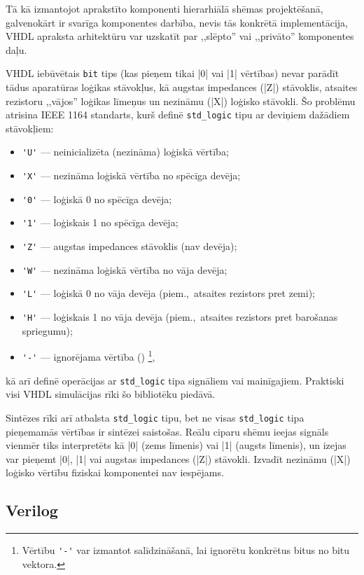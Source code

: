	Tā kā izmantojot aprakstīto komponenti hierarhiālā shēmas projektēšanā, 
	galvenokārt ir svarīga komponentes darbība, nevis tās konkrētā implementācija,
	VHDL apraksta arhitektūru var uzskatīt par ,,slēpto'' vai ,,privāto''
	komponentes daļu.

	VHDL iebūvētais \texttt{bit} tips (kas pieņem tikai |0| vai |1| vērtības)
	nevar parādīt tādus aparatūras loģikas stāvokļus, kā augstas impedances
	(|Z|) stāvoklis, atsaites rezistoru ,,vājos'' loģikas līmeņus un nezināmu
	(|X|) loģisko stāvokli. Šo problēmu atrisina IEEE 1164 standarts, kurš definē
	\texttt{std\_logic} tipu ar deviņiem dažādiem stāvokļiem:
	\begin{itemize}
		\item \verb|'U'| --- neinicializēta (nezināma) loģiskā vērtība;
		\item \verb|'X'| --- nezināma loģiskā vērtība no spēcīga devēja;
		\item \verb|'0'| --- loģiskā 0 no spēcīga devēja;
		\item \verb|'1'| --- loģiskais 1 no spēcīga devēja;
		\item \verb|'Z'| --- augstas impedances stāvoklis (nav devēja);
		\item \verb|'W'| --- nezināma loģiskā vērtība no vāja devēja;
		\item \verb|'L'| --- loģiskā 0 no vāja devēja (piem.,~atsaites rezistors pret zemi);
		\item \verb|'H'| --- loģiskais 1 no vāja devēja (piem.,~atsaites rezistors pret barošanas spriegumu);
		\item \verb|'-'| --- ignorējama vērtība ()%
			\footnote{Vērtību \verb|'-'| var izmantot salīdzināšanā,
				lai ignorētu konkrētus bitus no bitu vektora.},
	\end{itemize}
	kā arī definē operācijas ar \texttt{std\_logic} tipa signāliem vai mainīgajiem. 
	Praktiski visi VHDL simulācijas rīki šo bibliotēku piedāvā.
	
	Sintēzes rīki arī atbalsta \texttt{std\_logic} tipu, bet ne visas
	\texttt{std\_logic} tipa pieņemamās vērtības ir sintēzei saistošas.
	Reālu ciparu shēmu ieejas signāls vienmēr tiks interpretēts kā |0| (zems līmenis) 
	vai |1| (augsts līmenis), un izejas var pieņemt |0|, |1| vai augstas
	impedances (|Z|) stāvokli. Izvadīt nezināmu (|X|) loģisko vērtību
	fiziskai komponentei nav iespējams.

\subsection{Verilog} \label{sec:verilog}
\lipsum[5-6]

